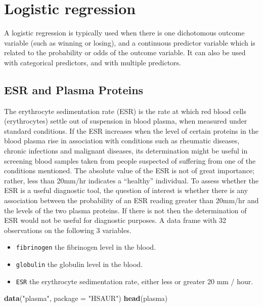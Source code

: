 \documentclass[]{article}
\def\tightlist{}
\newenvironment{Shaded}{\begin{snugshade}}{\end{snugshade}}
\newcommand{\KeywordTok}[1]{\textcolor[rgb]{0.13,0.29,0.53}{\textbf{{#1}}}}
\newcommand{\DataTypeTok}[1]{\textcolor[rgb]{0.13,0.29,0.53}{{#1}}}
\newcommand{\StringTok}[1]{\textcolor[rgb]{0.31,0.60,0.02}{{#1}}}
\newcommand{\NormalTok}[1]{{#1}}
\numberwithin{equation}{section}
\begin{document}
\section{Logistic regression}\label{logistic-regression}

A logistic regression is typically used when there is one dichotomous
outcome variable (such as winning or losing), and a continuous predictor
variable which is related to the probability or odds of the outcome
variable. It can also be used with categorical predictors, and with
multiple predictors.

\subsection{ESR and Plasma Proteins}\label{esr-and-plasma-proteins}

The erythrocyte sedimentation rate (ESR) is the rate at which red blood
cells (erythrocytes) settle out of suspension in blood plasma, when
measured under standard conditions. If the ESR increases when the level
of certain proteins in the blood plasma rise in association with
conditions such as rheumatic diseases, chronic infections and malignant
diseases, its determination might be useful in screening blood samples
taken from people suspected of suffering from one of the conditions
mentioned. The absolute value of the ESR is not of great importance;
rather, less than 20mm/hr indicates a ``healthy'' individual. To assess
whether the ESR is a useful diagnostic tool, the question of interest is
whether there is any association between the probability of an ESR
reading greater than 20mm/hr and the levels of the two plasma proteins.
If there is not then the determination of ESR would not be useful for
diagnostic purposes. A data frame with 32 observations on the following
3 variables.

\begin{itemize}
\tightlist
\item
  \texttt{fibrinogen} the fibrinogen level in the blood.
\item
  \texttt{globulin} the globulin level in the blood.
\item
  \texttt{ESR} the erythrocyte sedimentation rate, either less or
  greater 20 mm / hour.
\end{itemize}

\begin{Shaded}
\begin{Highlighting}[]
\KeywordTok{data}\NormalTok{(}\StringTok{"plasma"}\NormalTok{, }\DataTypeTok{package =} \StringTok{"HSAUR"}\NormalTok{)}
\KeywordTok{head}\NormalTok{(plasma)}
\end{Highlighting}
\end{Shaded}
\end{document}

